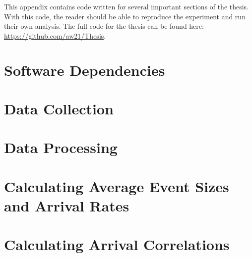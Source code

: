 This appendix contains code written for several important sections of the thesis. With this code, the reader should be able to reproduce the experiment and run their own analysis. The full code for the thesis can be found here: \url{https://github.com/aw21/Thesis}.

\section{Software Dependencies}
\begin{singlespacing}

\end{singlespacing}

\section{Data Collection}
\begin{singlespacing}
\label{data-collection-code}
\end{singlespacing}

\section{Data Processing}
\begin{singlespacing}
\label{data-processing-code}
\end{singlespacing}

\section{Calculating Average Event Sizes and Arrival Rates}
\begin{singlespacing}
\label{AES_and_rate_code}
\end{singlespacing}

\section{Calculating Arrival Correlations}
\begin{singlespacing}
\label{correlation-code}
\end{singlespacing}

